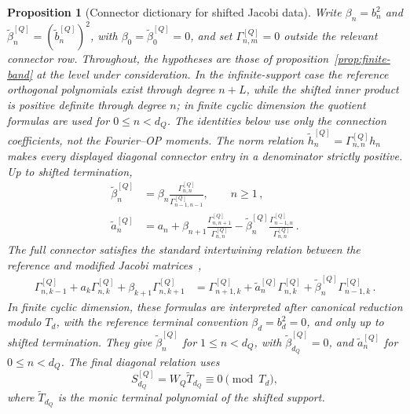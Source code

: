 \documentclass[a4paper,11pt]{article}
\newtheorem{proposition}{Proposition}[section]
\theoremstyle{definition}
\theoremstyle{remark}
\newcommand{\thh}{\widetilde h}
\begin{document}
\begin{proposition}[Connector dictionary for shifted Jacobi data]
\label{prop:connector-dictionary}
Write
$\beta_n=b_n^2$ and
$\widetilde\beta_n^{[Q]}=(\widetilde b_n^{[Q]})^2$, with
$\beta_0=\widetilde\beta_0^{[Q]}=0$, and set
$\Gamma_{n,m}^{[Q]}=0$ outside the relevant connector row. 
Throughout, the hypotheses are those of proposition~\ref{prop:finite-band} at the level under consideration. In the infinite-support case the reference orthogonal polynomials exist through degree $n+L$, while the shifted inner product is positive definite through degree $n$; in finite cyclic dimension the quotient formulas are used for $0\le n<d_Q$. The identities below use only the connection coefficients, not the Fourier--OP moments. The norm relation $\thh_n^{[Q]}=\Gamma_{n,n}^{[Q]}h_n$ makes every displayed diagonal connector entry in a denominator strictly positive. Up to shifted termination,
\begin{align}
   \widetilde\beta_n^{[Q]}
   &=
   \beta_n
   \frac{\Gamma_{n,n}^{[Q]}}
   {\Gamma_{n-1,n-1}^{[Q]}},
   \qquad n\ge1\,,
   \label{eq:connector-beta-dictionary-main}\\
   \widetilde a_n^{[Q]}
   &=
   a_n
   +
   \beta_{n+1}
   \frac{\Gamma_{n,n+1}^{[Q]}}
   {\Gamma_{n,n}^{[Q]}}
   -
   \widetilde\beta_n^{[Q]}
   \frac{\Gamma_{n-1,n}^{[Q]}}
   {\Gamma_{n,n}^{[Q]}}\,.
   \label{eq:connector-a-dictionary-main}
\end{align}
The full connector satisfies the standard intertwining relation between the reference and modified Jacobi matrices~\cite{KautskyGolub1983,GutlebOlverSlevinsky2024},
\begin{equation}
\begin{aligned}
   \Gamma_{n,k-1}^{[Q]}
   +a_k\Gamma_{n,k}^{[Q]}
   +\beta_{k+1}\Gamma_{n,k+1}^{[Q]}
   &=
   \Gamma_{n+1,k}^{[Q]}
   +\widetilde a_n^{[Q]}\Gamma_{n,k}^{[Q]}
   +\widetilde\beta_n^{[Q]}\Gamma_{n-1,k}^{[Q]}\,.
\end{aligned}
   \label{eq:connector-recurrence-compatibility-main}
\end{equation}
In finite cyclic dimension, these formulas are interpreted after canonical reduction modulo $T_d$, with the reference terminal convention $\beta_d=b_d^2=0$, and only up to shifted termination. They give
$\widetilde\beta_n^{[Q]}$ for $1\le n<d_Q$, with
$\widetilde\beta_{d_Q}^{[Q]}=0$, and
$\widetilde a_n^{[Q]}$ for $0\le n<d_Q$. The final diagonal relation uses
\begin{equation}
   S_{d_Q}^{[Q]}
   =
   W_Q\widetilde T_{d_Q}
   \equiv0
   \pmod{T_d},
\end{equation}
where $\widetilde T_{d_Q}$ is the monic terminal polynomial of the shifted support.
\end{proposition}
\end{document}
